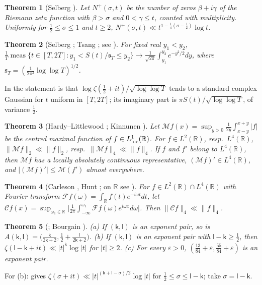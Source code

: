 \documentclass[preprint,12pt]{elsarticle}
\numberwithin{equation}{section}
\theoremstyle{plain}
\newtheorem{theorem}{Theorem}[section]
\theoremstyle{definition}
\theoremstyle{remark}
\newcommand{\R}{\mathbb R}
\begin{document}
\begin{theorem}[Selberg {\cite[Thm.~9.19(C)]{Titchmarsh1986}}]\label{thm:known_density}
Let $N^+(\sigma,t)$ be the number of zeros $\beta+i\gamma$ of the Riemann zeta function with $\beta>\sigma$ and $0<\gamma\le t$, counted with multiplicity. Uniformly for $\frac12\le\sigma\le1$ and $t\ge2$, $N^+(\sigma,t)\ll t^{1-\frac14(\sigma-\frac12)}\log t$.
\end{theorem}

\begin{theorem}[Selberg {\cite{Selberg1946a}}; Tsang {\cite{Tsang1984}}; see {\cite[(1.1)]{FazzariGerspachMinelli2025}}]\label{thm:known_selberg_clt}
For fixed real $y_1<y_2$, $\frac1T\operatorname{meas}\{t\in[T,2T]:y_1<S(t)/\mathfrak s_T\le y_2\}\to\frac1{\sqrt{2\pi}}\int_{y_1}^{y_2}e^{-y^2/2}dy$, where $\mathfrak s_T=(\frac1{2\pi^2}\log\log T)^{1/2}$.
\end{theorem}
In \cite{FazzariGerspachMinelli2025} the statement is that $\log\zeta(\frac12+it)/\sqrt{\log\log T}$ tends to a standard complex Gaussian for $t$ uniform in $[T,2T]$; its imaginary part is $\pi S(t)/\sqrt{\log\log T}$, of variance $\frac12$.

\begin{theorem}[Hardy--Littlewood {\cite[Ch.~I, Thm.~1]{Stein1970}}; Kinnunen {\cite{Kinnunen1997}}]\label{thm:known_maximal}
Let $\mathcal Mf(x)=\sup_{y>0}\frac1{2y}\int_{x-y}^{x+y}|f|$ be the centred maximal function of $f\in L^1_{\rm loc}(\R)$. For $f\in L^2(\R)$, resp.\ $L^4(\R)$, $\|\mathcal Mf\|_2\ll\|f\|_2$, resp.\ $\|\mathcal Mf\|_4\ll\|f\|_4$. If $f$ and $f'$ belong to $L^4(\R)$, then $\mathcal Mf$ has a locally absolutely continuous representative, $(\mathcal Mf)'\in L^4(\R)$, and $|(\mathcal Mf)'|\le\mathcal M(f')$ almost everywhere.
\end{theorem}

\begin{theorem}[Carleson {\cite{Carleson1966}}, Hunt {\cite{Hunt1968}}; on $\R$ see {\cite{Lerner2013}}]\label{thm:known_carleson}
For $f\in L^2(\R)\cap L^4(\R)$ with Fourier transform $\mathcal Ff(\omega)=\int_\R f(t)e^{-i\omega t}dt$, let $\mathcal Cf(x)=\sup_{\omega_1\in\R}\bigl|\frac1{2\pi}\int_{-\infty}^{\omega_1}\mathcal Ff(\omega)e^{i\omega x}d\omega\bigr|$. Then $\|\mathcal Cf\|_4\ll\|f\|_4$.
\end{theorem}

\begin{theorem}[{\cite[Lemma~2.8 and (7.57)]{Ivic1985}}; Bourgain {\cite[Thm.~6]{Bourgain2017}}]\label{thm:known_exponents}
(a) If $(\mathsf k,\mathsf l)$ is an exponent pair, so is $A(\mathsf k,\mathsf l)=\bigl(\frac{\mathsf k}{2\mathsf k+2},\frac12+\frac{\mathsf l}{2\mathsf k+2}\bigr)$. (b) If $(\mathsf k,\mathsf l)$ is an exponent pair with $\mathsf l-\mathsf k\ge\frac12$, then $\zeta(\mathsf l-\mathsf k+it)\ll|t|^{\mathsf k}\log|t|$ for $|t|\ge2$. (c) For every $\varepsilon>0$, $(\frac{13}{84}+\varepsilon,\frac{55}{84}+\varepsilon)$ is an exponent pair.
\end{theorem}
For (b): \cite[(7.57)]{Ivic1985} gives $\zeta(\sigma+it)\ll|t|^{(\mathsf k+\mathsf l-\sigma)/2}\log|t|$ for $\frac12\le\sigma\le\mathsf l-\mathsf k$; take $\sigma=\mathsf l-\mathsf k$.
\end{document}
